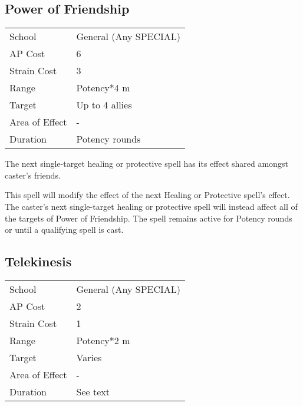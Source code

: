 \documentclass[11pt,a4paper,twocolumn]{book}
\begin{document}
\subsection*{Power of Friendship}
{
	\begin{tabu} to 75mm{| X[l,4] | X[l,7] |}
		\hline
		School 			& General (Any SPECIAL) 	\\
		AP Cost	      	& 6 					\\
		Strain Cost     & 3 					\\
		Range     		& Potency*4 m			\\
		Target      	& Up to 4 allies		\\
		Area of Effect  & -  	 				\\
		Duration     	& Potency rounds		\\ \hline
	\end{tabu}
	
}

\medskip

The next single-target healing or protective spell has its effect shared amongst caster's friends.

This spell will modify the effect of the next Healing or Protective spell's effect. The caster's next single-target healing or protective spell will instead affect all of the targets of Power of Friendship. The spell remains active for Potency rounds or until a qualifying spell is cast.

\vfill

\subsection*{Telekinesis}
{
	\begin{tabu} to 75mm{| X[l,4] | X[l,7] |}
		\hline
		School 			& General (Any SPECIAL) 		\\
		AP Cost	      	& 2 						\\
		Strain Cost     & 1 						\\
		Range     		& Potency*2 m					\\
		Target      	& Varies					\\
		Area of Effect  & - 	 						\\
		Duration     	& See text					\\ \hline
	\end{tabu}
	
}
\end{document}
